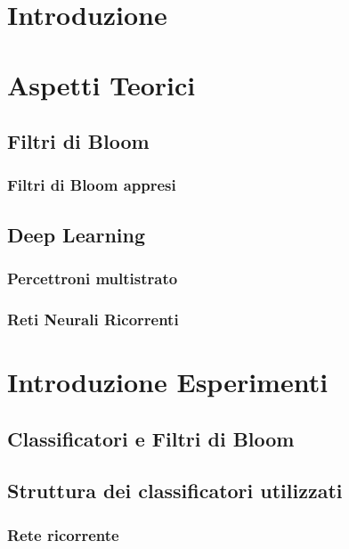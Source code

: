 \documentclass{article}
\begin{document}
\section{Introduzione}

\section{Aspetti Teorici}
\subsection{Filtri di Bloom}
\subsubsection{Filtri di Bloom appresi}
\subsection{Deep Learning} %
\subsubsection{Percettroni multistrato}
\subsubsection{Reti Neurali Ricorrenti}

\section{Introduzione Esperimenti}

\subsection{Classificatori e Filtri di Bloom}

\subsection{Struttura dei classificatori utilizzati}
\subsubsection{Rete ricorrente}
\end{document}
